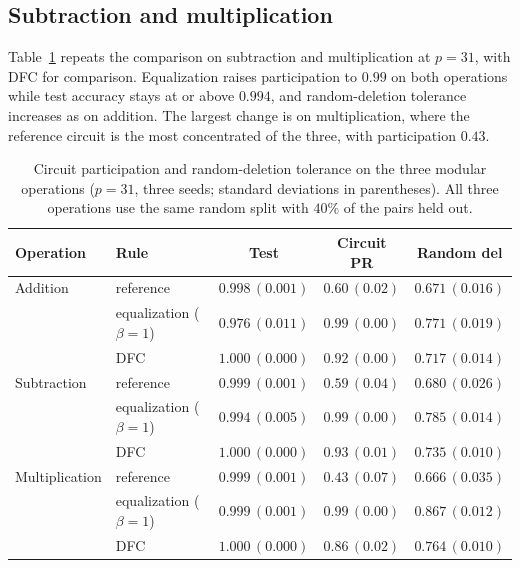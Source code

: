 \documentclass{article} %
\begin{document}
\subsection{Subtraction and multiplication}
\label{app:ops}
Table~\ref{tab:ops} repeats the comparison on subtraction and multiplication at $p = 31$, with DFC for comparison. Equalization raises participation to $0.99$ on both operations while test accuracy stays at or above $0.994$, and random-deletion tolerance increases as on addition. The largest change is on multiplication, where the reference circuit is the most concentrated of the three, with participation $0.43$.

\begin{table}[!ht]
\caption{Circuit participation and random-deletion tolerance on the three modular operations ($p=31$, three seeds; standard deviations in parentheses). All three operations use the same random split with $40\%$ of the pairs held out.}
\label{tab:ops}
\begin{center}
\small
\begin{tabular}{llccc}
\toprule
Operation & Rule & Test & Circuit PR & Random del \\
\midrule
Addition       & reference & $0.998\,(0.001)$ & $0.60\,(0.02)$ & $0.671\,(0.016)$ \\
               & equalization ($\beta{=}1$) & $0.976\,(0.011)$ & $0.99\,(0.00)$ & $0.771\,(0.019)$ \\
               & DFC & $1.000\,(0.000)$ & $0.92\,(0.00)$ & $0.717\,(0.014)$ \\
\midrule
Subtraction    & reference & $0.999\,(0.001)$ & $0.59\,(0.04)$ & $0.680\,(0.026)$ \\
               & equalization ($\beta{=}1$) & $0.994\,(0.005)$ & $0.99\,(0.00)$ & $0.785\,(0.014)$ \\
               & DFC & $1.000\,(0.000)$ & $0.93\,(0.01)$ & $0.735\,(0.010)$ \\
\midrule
Multiplication & reference & $0.999\,(0.001)$ & $0.43\,(0.07)$ & $0.666\,(0.035)$ \\
               & equalization ($\beta{=}1$) & $0.999\,(0.001)$ & $0.99\,(0.00)$ & $0.867\,(0.012)$ \\
               & DFC & $1.000\,(0.000)$ & $0.86\,(0.02)$ & $0.764\,(0.010)$ \\
\bottomrule
\end{tabular}
\end{center}
\end{table}
\end{document}
